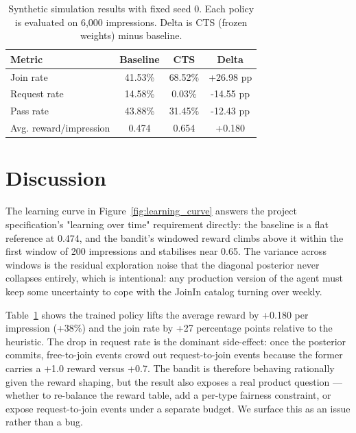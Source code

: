 \documentclass{article}
\begin{document}
\begin{table}[t]
\caption{Synthetic simulation results with fixed seed 0. Each policy is evaluated on 6,000 impressions. Delta is CTS (frozen weights) minus baseline.}
\label{tab:results}
\vskip 0.1in
\begin{center}
\begin{small}
\begin{tabular}{lccc}
\toprule
Metric & Baseline & CTS & Delta \\
\midrule
Join rate & 41.53\% & 68.52\% & +26.98 pp \\
Request rate & 14.58\% & 0.03\% & -14.55 pp \\
Pass rate & 43.88\% & 31.45\% & -12.43 pp \\
Avg. reward/impression & 0.474 & 0.654 & +0.180 \\
\bottomrule
\end{tabular}
\end{small}
\end{center}
\vskip -0.1in
\end{table}

\section{Discussion}
The learning curve in Figure~\ref{fig:learning_curve} answers the project specification's "learning over time" requirement directly: the baseline is a flat reference at 0.474, and the bandit's windowed reward climbs above it within the first window of 200 impressions and stabilises near 0.65. The variance across windows is the residual exploration noise that the diagonal posterior never collapses entirely, which is intentional: any production version of the agent must keep some uncertainty to cope with the JoinIn catalog turning over weekly.

Table~\ref{tab:results} shows the trained policy lifts the average reward by +0.180 per impression (+38\%) and the join rate by +27 percentage points relative to the heuristic. The drop in request rate is the dominant side-effect: once the posterior commits, free-to-join events crowd out request-to-join events because the former carries a +1.0 reward versus +0.7. The bandit is therefore behaving rationally given the reward shaping, but the result also exposes a real product question — whether to re-balance the reward table, add a per-type fairness constraint, or expose request-to-join events under a separate budget. We surface this as an issue rather than a bug.
\end{document}
